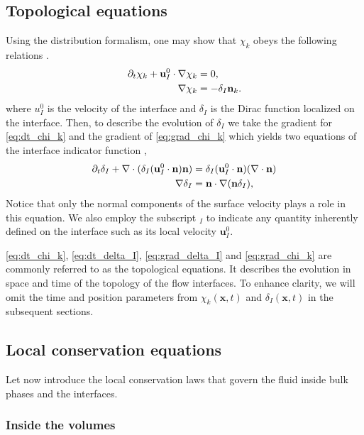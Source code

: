 \subsection{Topological equations}
Using the distribution formalism, one may show that $\chi_k$ obeys the following relations \citep{drew1983mathematical,orlando2023evolution}. 
\begin{align}
    \partial_t \chi_k
    + \textbf{u}_I^0 \cdot \mathbf{\nabla} \chi_k
    &= 0,
    \label{eq:dt_chi_k}\\
    \label{eq:grad_chi_k}
    \mathbf{\nabla} \chi_k
    &= - \delta_I \textbf{n}_k. 
\end{align}
where $u^0_I$ is the velocity of the interface and $\delta_I$ is the Dirac function localized on the interface.
Then, to describe the evolution of $\delta_I$ we take the gradient for \ref{eq:dt_chi_k} and the gradient of \ref{eq:grad_chi_k} which yields two equations of the interface indicator function \citep{marle1982macroscopic,morel2007surface,orlando2023evolution},
\begin{align}
    \partial_t \delta_I
    + \mathbf{\nabla}\cdot (\delta_I (\textbf{u}_I^0\cdot \textbf{n}) \textbf{n})
    &= \delta_I (\textbf{u}_I^0 \cdot \textbf{n})(\mathbf{\nabla}\cdot\textbf{n})
    \label{eq:dt_delta_I}\\
    \mathbf{\nabla}\delta_I 
    &= \textbf{n} \cdot \mathbf{\nabla} (\textbf{n} \delta_I),
    \label{eq:grad_delta_I}
\end{align}
Notice that only the normal components of the surface velocity plays a role in this equation. 
We also employ the subscript $_I$ to indicate any quantity inherently defined on the interface such as its local velocity $\textbf{u}_I^0$. 

\ref{eq:dt_chi_k}, \ref{eq:dt_delta_I}, \ref{eq:grad_delta_I} and \ref{eq:grad_chi_k} are commonly referred to as the topological equations. 
It describes the evolution in space and time of the topology of the flow interfaces.
To enhance clarity, we will omit the time and position parameters from $\chi_k(\textbf{x},t)$ and $\delta_I(\textbf{x},t)$ in the subsequent sections.

\subsection{Local conservation equations}
\label{sec:local_eq}
Let now introduce the local conservation laws that govern the fluid inside bulk phases and the interfaces. 

\subsubsection{Inside the volumes}

